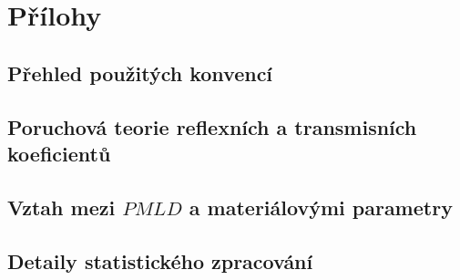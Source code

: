 \documentclass[singleside]{thesis}
\begin{document}

\tableofcontents





\appendix
  \chapter{Přílohy}
  \section{Přehled použitých konvencí}\label{k:dodatek konvence}
  \section{Poruchová teorie reflexních a transmisních koeficientů}\label{k:dodatek vypocet}
  \section{Vztah mezi $PMLD$ a materiálovými parametry}
  \section{Detaily statistického zpracování}

\openright
\end{document}
